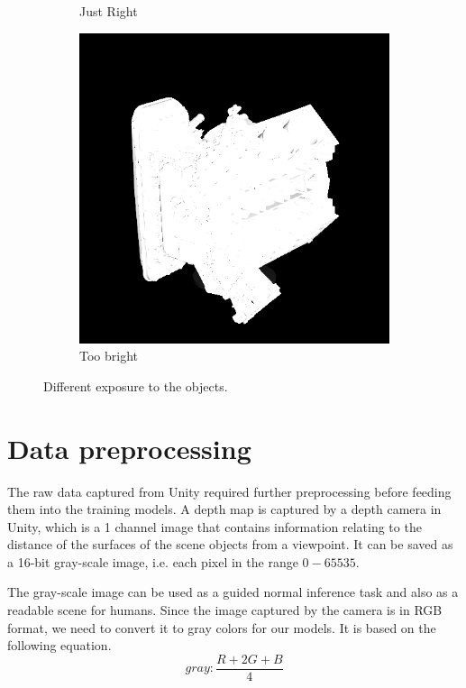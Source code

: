 \begin{figure}[H]
\begin{subfigure}[b]{0.32\linewidth}
		\caption{Just Right}
	\end{subfigure}
	\begin{subfigure}[b]{0.32\linewidth}
		\includegraphics[width=\textwidth]{./Figures/wrong_exposure.png}
		\caption{Too bright}
	\end{subfigure}
	\decoRule
	\caption{Different exposure to the objects.}
	\label{fig:camera_exposure}
\end{figure}




\section{Data preprocessing}
The raw data captured from Unity required further preprocessing before feeding them into the training models. 
A depth map is captured by a depth camera in Unity, which is a 1 channel image that contains information relating to the distance of the surfaces of the scene objects from a viewpoint. It can be saved as a 16-bit gray-scale image, i.e. each pixel in the range $0 - 65535$. 


The gray-scale image can be used as a guided normal inference task and also as a readable scene for humans. Since the image captured by the camera is in RGB format, we need to convert it to gray colors for our models. It is based on the following equation.
\[ gray: \frac{R+2G+B}{4}  \]

